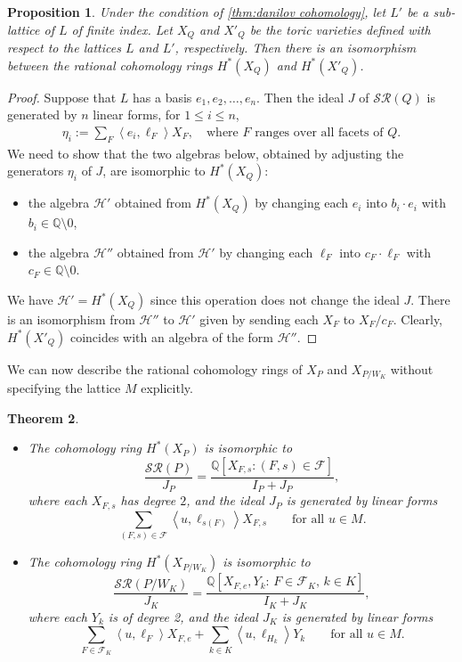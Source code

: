 \documentclass{amsart}
\theoremstyle{plain} \numberwithin{equation}{section}
\newtheorem{theorem}{Theorem}[section]
\newtheorem{proposition}[theorem]{Proposition}
\theoremstyle{definition}
\newcommand{\Q}{\mathbb{Q}}
\newcommand{\ip}[1]{\left\langle #1 \right\rangle}
\begin{document}
\begin{proposition}\label{prop:indep lattice}
  Under the condition of \cref{thm:danilov cohomology}, 
  let $L'$ be a sub-lattice of $L$ of finite  index. 
  Let $X_Q$ and $X'_Q$ be the toric varieties defined with respect to the lattices $L$ and $L'$, respectively.
  Then there is an isomorphism between the rational cohomology rings $H^*(X_Q)$ and $H^*(X'_Q)$.
\end{proposition}
\begin{proof}
  Suppose that $L$ has a basis $e_1,e_2,\ldots,e_n$. Then the ideal $J$ of $\mathcal{SR}(Q)$ is generated by $n$ linear forms, for $1\leq i\leq n$,
  \begin{align*}
    \eta_i:= \sum_{F}\ip{e_i,\ell_F}X_F,\quad\mbox 
  {where $F$ ranges over all facets of $Q$.}
  \end{align*}
  We need to show that the two algebras below, obtained by adjusting the generators $\eta_i$ of $J$, are isomorphic to $H^*(X_Q)$:
  \begin{itemize}
    \item the algebra $\mathcal{H}'$ obtained from $H^*(X_Q)$  by changing each $e_i$ into $b_i\cdot e_i$ with $b_i\in\Q\setminus 0$,
    \item the algebra $\mathcal{H}''$ obtained from $\mathcal{H}'$  by changing each $\ell_F$ into $c_F\cdot \ell_F$ with $c_F\in\Q\setminus 0$.
  \end{itemize}
  We have $\mathcal{H}'=H^*(X_Q)$ since this operation does not change the ideal $J$.
   There is an isomorphism from $\mathcal{H}''$ to $\mathcal{H}'$ given by sending each $X_F$ to $X_F/c_F$. 
   Clearly, $H^*(X'_Q)$ coincides with an algebra of the form $\mathcal{H}''$.
   \qedhere
\end{proof}


We can now describe the rational cohomology rings of $X_P$ and $X_{P/W_K}$ without specifying the lattice $M$ explicitly.

\begin{theorem}\label{thm:cohomology of variety}\phantom{}
  \begin{itemize}
    \item[$(1)$] The cohomology ring $H^*(X_{P})$ is isomorphic to 
  $$ \frac{\mathcal{SR}(P)}{J_P}=\frac{\Q[X_{F,s}: (F,s)\in \mathcal{F}]}{I_P+J_P},
  $$
  where each $X_{F,s}$ has degree $2$, and the ideal $J_P$ is generated by linear forms
  $$\sum_{(F,s)\in\mathcal{F}}\ip{u,\ell_{s(F)}}X_{F,s}\qquad \mbox{for all}\,\, u\in M.$$
  
  \item[$(2)$] The cohomology ring $H^*(X_{P/W_K})$ is isomorphic to 
  $$ \frac{\mathcal{SR}(P/W_K)}{J_K}=\frac{\Q[X_{F,e}, Y_k:\, F\in\mathcal{F}_K,\, k\in K]}{I_K+J_K},
  $$
  where each $Y_k$ is of degree 2, and the ideal $J_K$ is generated by linear forms 
  $$\sum_{F\in\mathcal{F}_K}\ip{u,\ell_{F}}X_{F,e}+\sum_{k\in K}\ip{u,\ell_{H_k}}Y_k\qquad \mbox{for all}\,\, u\in M.$$
  \end{itemize}
\end{theorem}
\end{document}

